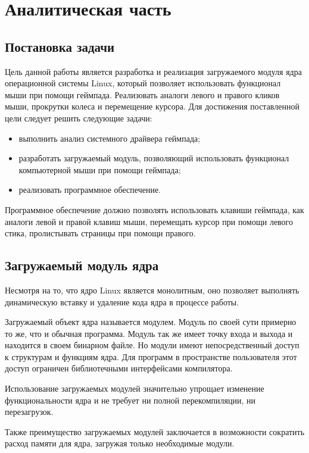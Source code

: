 \section{Аналитическая часть}
\subsection{Постановка задачи}
Цель данной работы является разработка и реализация загружаемого
модуля ядра операционной системы Linux, который позволяет использовать функционал мыши при помощи геймпада. Реализовать аналоги левого и правого кликов мыши, прокрутки колеса и перемещение курсора. Для достижения
поставленной цели следует решить следующие задачи:
\begin{itemize}
	\item выполнить анализ системного драйвера геймпада;
	\item разработать загружаемый модуль, позволяющий использовать функционал компьютерной мыши
	при помощи геймпада;
	\item реализовать программное обеспечение.
\end{itemize}
Программное обеспечение должно позволять использовать клавиши геймпада, как аналоги левой и правой клавиш мыши, перемещать курсор при помощи левого стика, пролистывать страницы при помощи правого.\par

\subsection{Загружаемый модуль ядра}
Несмотря на то, что ядро Linux является монолитным, оно позволяет
выполнять динамическую вставку и удаление кода ядра в процессе работы.\par
Загружаемый объект ядра называется модулем. Модуль по своей сути примерно то же, что и обычная программа. Модуль
так же имеет точку входа и выхода и находится в своем бинарном файле. Но
модули имеют непосредственный доступ к структурам и функциям ядра. Для
программ в пространстве пользователя этот доступ ограничен библиотечными
интерфейсами компилятора\cite{soloviev}.\par
Использование загружаемых модулей значительно упрощает изменение
функциональности ядра и не требует ни полной перекомпиляции, ни перезагрузок.\par
Также преимущество загружаемых модулей заключается в возможности сократить расход памяти для ядра, загружая только
необходимые модули.

